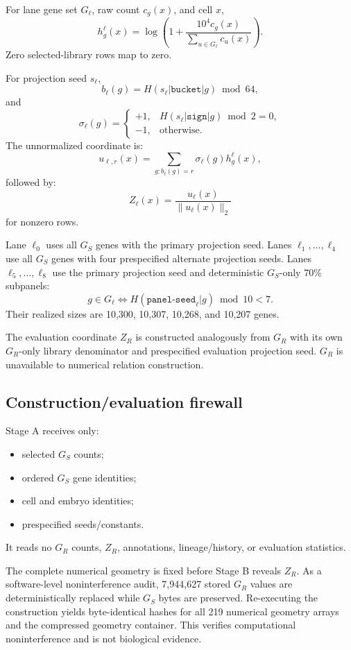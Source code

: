 \documentclass[11pt]{article}
\newcommand{\ZR}{Z_R}
\begin{document}
For lane gene set \(G_\ell\), raw count \(c_g(x)\), and cell \(x\),
\[
h_g^\ell(x)=
\log\left(
1+\frac{10^4 c_g(x)}
{\sum_{u\in G_\ell} c_u(x)}
\right).
\]
Zero selected-library rows map to zero.

For projection seed \(s_\ell\),
\[
b_\ell(g)
=
H(s_\ell|\texttt{bucket}|g)\bmod64,
\]
and
\[
\sigma_\ell(g)=
\begin{cases}
+1,&H(s_\ell|\texttt{sign}|g)\bmod2=0,\\
-1,&\text{otherwise}.
\end{cases}
\]
The unnormalized coordinate is:
\[
u_{\ell,r}(x)
=
\sum_{g:b_\ell(g)=r}
\sigma_\ell(g)h_g^\ell(x),
\]
followed by:
\[
Z_\ell(x)=
\frac{u_\ell(x)}{\|u_\ell(x)\|_2}
\]
for nonzero rows.

Lane \(\ell_0\) uses all \(G_S\) genes with the primary projection seed. Lanes \(\ell_1,\ldots,\ell_4\) use all \(G_S\) genes with four prespecified alternate projection seeds. Lanes \(\ell_5,\ldots,\ell_8\) use the primary projection seed and deterministic \(G_S\)-only 70\% subpanels:
\[
g\in G_{\ell}
\iff
H(\texttt{panel-seed}_\ell|g)\bmod10<7.
\]
Their realized sizes are 10,300, 10,307, 10,268, and 10,207 genes.

The evaluation coordinate \(\ZR\) is constructed analogously from \(G_R\) with its own \(G_R\)-only library denominator and prespecified evaluation projection seed. \(G_R\) is unavailable to numerical relation construction.

\subsection{Construction/evaluation firewall}

Stage A receives only:
\begin{itemize}[leftmargin=2em]
\item selected \(G_S\) counts;
\item ordered \(G_S\) gene identities;
\item cell and embryo identities;
\item prespecified seeds/constants.
\end{itemize}
It reads no \(G_R\) counts, \(\ZR\), annotations, lineage/history, or evaluation statistics.

The complete numerical geometry is fixed before Stage B reveals \(\ZR\). As a software-level noninterference audit, 7,944,627 stored \(G_R\) values are deterministically replaced while \(G_S\) bytes are preserved. Re-executing the construction yields byte-identical hashes for all 219 numerical geometry arrays and the compressed geometry container. This verifies computational noninterference and is not biological evidence.
\end{document}
